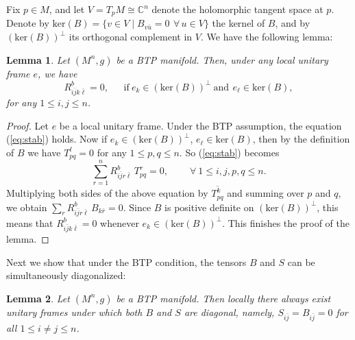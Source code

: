 \documentclass{amsart}
\newtheorem{lemma}{Lemma}
\begin{document}
Fix $p\in M$, and let $V=T_pM\cong{\mathbb C}^n$ denote the holomorphic tangent space at $p$. Denote by $\mbox{ker}(B)=\{ v \in V \mid B_{v\bar{u}}=0 \ \,\forall \, u\in V\}$ the kernel of $B$, and by $(\mbox{ker}(B))^{\perp}$ its orthogonal complement in $V$. We have the following lemma:
\begin{lemma} \label{lemmakernelB}
Let $(M^n,g)$ be a BTP manifold. Then, under any local unitary frame $e$, we have
\begin{equation} \label{eq:kernelB}
 R^b_{i\bar{j}k\bar{\ell}} = 0,  \ \ \ \ \ \ \ \mbox{if} \ e_k\in (\mbox{ker}(B))^{\perp} \  \mbox{and} \ \,e_{\ell} \in \mbox{ker}(B),
\end{equation}
for any $1\leq i,j\leq n$.
\end{lemma}

\begin{proof}
Let $e$ be a local unitary frame. Under the BTP assumption, the equation (\ref{eq:stab}) holds. Now if $e_k\in (\mbox{ker}(B))^{\perp}$,  $e_{\ell} \in \mbox{ker}(B)$, then by the definition of $B$ we have $T^{\ell}_{pq}=0$ for any $1\leq p,q\leq n$. So (\ref{eq:stab}) becomes
$$ \sum_{r=1}^n  R^b_{i\bar{j}r\bar{\ell}}\,T^r_{pq}  =0, \ \ \ \ \ \ \ \ \ \ \forall \ 1\leq i,j,p,q\leq n. $$
Multiplying both sides of the above equation by $\overline{T^k_{pq}}$ and summing over $p$ and $q$, we obtain $\sum_r R^b_{i\bar{j}r\bar{\ell}}\,B_{k\bar{r}} = 0$. Since $B$ is positive definite on $(\mbox{ker}(B))^{\perp}$, this means that $R^b_{i\bar{j}k\bar{\ell}}=0$ whenever $e_k\in (\mbox{ker}(B))^{\perp}$. This finishes the proof of the lemma.
\end{proof}

Next we show that under the BTP condition, the tensors $B$ and $S$ can be simultaneously diagonalized:

\begin{lemma} \label{lemmadiag}
Let $(M^n,g)$ be a BTP manifold. Then locally there always exist  unitary frames under which both $B$ and $S$ are diagonal, namely,  $S_{i\bar{j}}=B_{i\bar{j}}=0$ for all  $1\leq i\neq j\leq n$.
\end{lemma}
\end{document}
